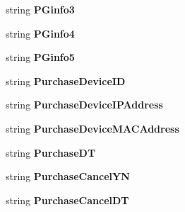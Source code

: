 \begin{DoxyCompactItemize}
\item 
string {\bfseries P\+Ginfo3}\hypertarget{a00066_a330d13f5009c1d8e29d410850e16423f}{}\label{a00066_a330d13f5009c1d8e29d410850e16423f}

\item 
string {\bfseries P\+Ginfo4}\hypertarget{a00066_a1ce1038c9f68d296911cf22c1a205841}{}\label{a00066_a1ce1038c9f68d296911cf22c1a205841}

\item 
string {\bfseries P\+Ginfo5}\hypertarget{a00066_a5f112ee71c5e9f8bf0b5665d1af440b6}{}\label{a00066_a5f112ee71c5e9f8bf0b5665d1af440b6}

\item 
string {\bfseries Purchase\+Device\+ID}\hypertarget{a00066_a4d3a54602fae483ca56069855a13e23f}{}\label{a00066_a4d3a54602fae483ca56069855a13e23f}

\item 
string {\bfseries Purchase\+Device\+I\+P\+Address}\hypertarget{a00066_a4cf0ade5b91019772d1a272c875aedb8}{}\label{a00066_a4cf0ade5b91019772d1a272c875aedb8}

\item 
string {\bfseries Purchase\+Device\+M\+A\+C\+Address}\hypertarget{a00066_a7cec8a1548e3e6b7d2c7dbeaa432035d}{}\label{a00066_a7cec8a1548e3e6b7d2c7dbeaa432035d}

\item 
string {\bfseries Purchase\+DT}\hypertarget{a00066_a18eddf0bf5d7059082752d3b5316a206}{}\label{a00066_a18eddf0bf5d7059082752d3b5316a206}

\item 
string {\bfseries Purchase\+Cancel\+YN}\hypertarget{a00066_acd01dec2759161b90a2318e86ae00d99}{}\label{a00066_acd01dec2759161b90a2318e86ae00d99}

\item 
string {\bfseries Purchase\+Cancel\+DT}\hypertarget{a00066_a3c120b75b13ded22770251928b654f14}{}\label{a00066_a3c120b75b13ded22770251928b654f14}


\end{DoxyCompactItemize}
